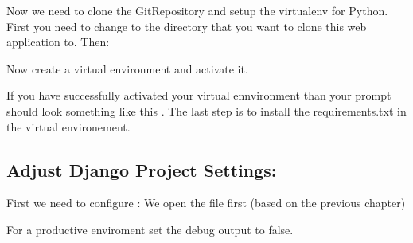 \documentclass[letterpaper,10pt,english]{sphinxmanual}
\begin{document}
Now we need to clone the Git\sphinxhyphen{}Repository and setup the virtualenv for Python.
First you need to change to the directory that you want to clone this web application to.
Then:
\begin{quote}

\end{quote}

Now create a virtual environment and activate it.
\begin{quote}

\begin{DUlineblock}{0em}
\item[] 
\item[] 
\end{DUlineblock}
\end{quote}

If you have successfully activated your virtual ennvironment than your prompt should
look something like this . The last
step is to install the requirements.txt in the virtual environement.
\begin{quote}

\end{quote}


\subsection{Adjust Django Project Settings:}
\label{\detokenize{masterAdminDoc:adjust-django-project-settings}}
First we need to configure :
We open the file first (based on the previous chapter)
\begin{quote}

\end{quote}

For a productive enviroment set the debug output to false.
\begin{quote}

\end{quote}
\end{document}

